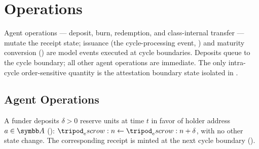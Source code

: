 \documentclass[../main.tex]{subfiles}
\begin{document}
%
%
%

\section{Operations}
\label{sec:attestation:operations}

Agent operations --- deposit, burn, redemption, and class-internal transfer --- mutate the
receipt state; issuance (the cycle-processing event, )
and maturity conversion () are model events executed at cycle boundaries.
Deposits queue to the cycle boundary; all other agent operations are immediate. The only
intra-cycle order-sensitive quantity is the attestation boundary state isolated in
.

\subsection{Agent Operations}
\label{sec:operations:agent}

\begin{definition}[Deposit]
    \label{def:operations:deposit}
    A funder deposits $\delta > 0$ reserve units at time $t$ in favor of holder address
    $a \in \addrspace$ ():
    $\escrow{} \gets \escrow{} + \delta$, with no other state change. The corresponding
    receipt is minted at the next cycle boundary ().
\end{definition}
\end{document}
